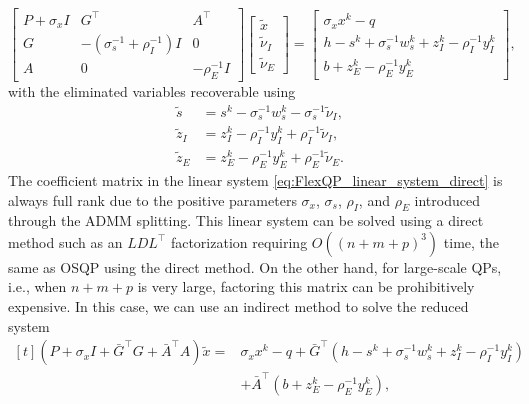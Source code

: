 \documentclass{article} %
\begin{document}
\begin{equation} \label{eq:FlexQP_linear_system_direct}
    \begin{bmatrix}
        P + \sigma_x I & G^\top & A^\top \\
        G & -(\sigma_s^{-1} + \rho_I^{-1})I & 0 \\
        A & 0 & -\rho_E^{-1} I
    \end{bmatrix} \begin{bmatrix}
        \tilde{x} \\ \tilde{\nu}_I \\ \tilde{\nu}_E
    \end{bmatrix} = \begin{bmatrix}
        \sigma_x x^k - q \\
        h - s^k + \sigma_s^{-1} w_s^k + z_I^k - \rho_I^{-1} y_I^k \\
        b + z_E^k - \rho_E^{-1} y_E^k
    \end{bmatrix},
\end{equation}
with the eliminated variables recoverable using
\begin{subequations}
\begin{align}
    \tilde{s} &= s^k - \sigma_s^{-1} w_s^k - \sigma_s^{-1} \tilde{\nu}_I, \\
    \tilde{z}_I &= z_I^k - \rho_I^{-1} y_I^k + \rho_I^{-1} \tilde{\nu}_I, \\
    \tilde{z}_E &= z_E^k - \rho_E^{-1} y_E^k + \rho_E^{-1} \tilde{\nu}_E.
\end{align}
\end{subequations}
The coefficient matrix in the linear system \cref{eq:FlexQP_linear_system_direct} is always full rank due to the positive parameters $\sigma_x$, $\sigma_s$, $\rho_I$, and $\rho_E$ introduced through the ADMM splitting. This linear system can be solved using a direct method such as an $LDL^\top$ factorization requiring $O((n + m + p)^3)$ time, the same as OSQP using the direct method. On the other hand, for large-scale QPs, i.e., when $n + m + p$ is very large, factoring this matrix can be prohibitively expensive. In this case, we can use an indirect method to solve the reduced system
\begin{equation} \label{eq:FlexQP_linear_system_indirect}
    \begin{aligned}[t]
        ( P + \sigma_x I + \bar{G}^\top G + \bar{A}^\top A ) \tilde{x} ={}&  \sigma_x x^k - q + \bar{G}^\top (h - s^k + \sigma_s^{-1} w_s^k + z_I^k - \rho_I^{-1} y_I^k) \\
        & + \bar{A}^\top (b + z_E^k - \rho_E^{-1} y_E^k),
    \end{aligned}
\end{equation}
\end{document}
